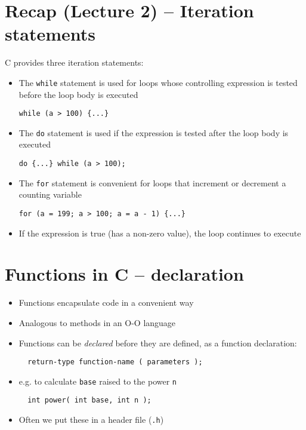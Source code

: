 \documentclass{article}
\begin{document}
\section{Recap (Lecture 2) -- Iteration statements}
C provides three iteration statements:
\begin{itemize}
\item The \verb!while! statement is used for loops whose controlling expression is tested before the loop body is executed
\begin{verbatim}
while (a > 100) {...}
\end{verbatim}
\item The \verb!do! statement is used if the expression is tested after the loop body is executed
\begin{verbatim}
do {...} while (a > 100);
\end{verbatim}
\item The \verb!for! statement is convenient for loops that increment or decrement a counting variable
\begin{verbatim}
for (a = 199; a > 100; a = a - 1) {...}
\end{verbatim}
\item If the expression is true (has a non-zero value), the loop continues to execute
\end{itemize}



\section{Functions in C -- declaration}
\begin{itemize}
\item Functions encapsulate code in a convenient way
\item Analogous to methods in an O-O language

\item Functions can be \emph{declared} before they are defined, as a function declaration:

\begin{verbatim}
  return-type function-name ( parameters );
\end{verbatim}

\item e.g. to calculate  \verb!base! raised to the power \verb!n! 

\begin{verbatim}
  int power( int base, int n );
\end{verbatim}

\item Often we put these in a header file (\verb!.h!)
\end{itemize}
\end{document}
